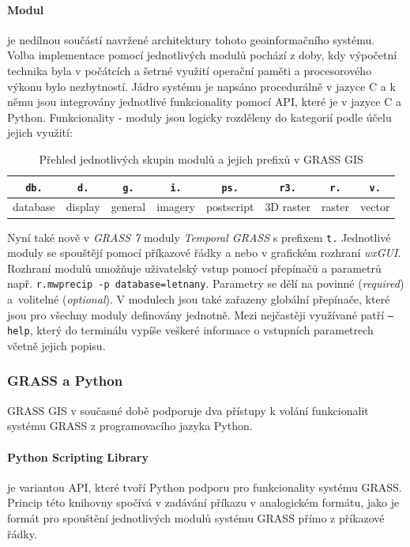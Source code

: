 \documentclass[a4paper,12pt,oneside]{report}
\begin{document}
\paragraph*{Modul} je nedílnou součástí navržené architektury tohoto
geoinformačního systému. Volba implementace pomocí jednotlivých modulů
pochází z doby, kdy výpočetní technika byla v počátcích a šetrné
využití operační paměti a procesorového výkonu bylo nezbytností. Jádro
systému je napsáno procedurálně v jazyce C a k němu jsou integrovány
jednotlivé funkcionality pomocí \acs{API}, které je v jazyce C a
Python. Funkcionality - moduly jsou logicky rozděleny do kategorií
podle účelu jejich využití:
\begin{table}[h]
\centering
\begin{tabular}{|cccccccc|}
\hline
{\tt db.} & {\tt d.} & {\tt g.} & {\tt i.} & {\tt ps.} & {\tt r3.} & {\tt r.} & {\tt v.} \\
\hline \hline
database & display & general & imagery & postscript & 3D raster & raster & vector \\ \hline
\end{tabular}
\caption{Přehled jednotlivých skupin modulů a jejich prefixů v GRASS GIS}
\label{tab:module}
\end{table}


Nyní také nově v \textit{GRASS 7} moduly \textit{Temporal GRASS} s
prefixem \texttt{t.} Jednotlivé moduly se spouštějí pomocí příkazové
řádky a nebo v grafickém rozhraní \textit{wxGUI}. Rozhraní modulů
umožňuje uživatelský vstup pomocí přepínačů a parametrů
např. \texttt{r.mwprecip -p database=letnany}. Parametry se dělí na
povinné (\textit{required}) a~volitelné (\textit{optional}). V
modulech jsou také zařazeny globální přepínače, které jsou pro všechny moduly
definovány jednotně. Mezi nejčastěji využívané patří \texttt{--help},
který do terminálu vypíše veškeré informace o vstupních parametrech
včetně jejich popisu.

\subsubsection*{GRASS a Python}
GRASS GIS v současné době podporuje dva přístupy k volání funkcionalit
systému GRASS z programovacího jazyka Python.

\paragraph*{Python Scripting Library} je variantou API, které tvoří
Python podporu pro funkcionality systému GRASS. Princip této knihovny spočívá
v zadávání příkazu v analogickém formátu, jako je formát pro spouštění
jednotlivých modulů systému GRASS přímo z příkazové řádky.
\end{document}
